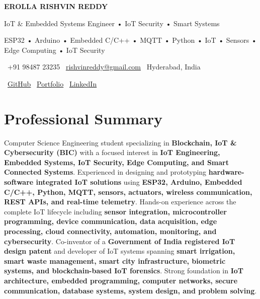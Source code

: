 \documentclass[a4paper,11pt]{article}
\begin{document}

\begin{center}

{\Huge \textbf{EROLLA RISHVIN REDDY}}

\vspace{4pt}

{\large IoT \& Embedded Systems Engineer • IoT Security • Smart Systems}

\vspace{5pt}

{\small
ESP32 • Arduino • Embedded C/C++ • MQTT • Python • IoT • Sensors • Edge Computing • IoT Security
}

\vspace{8pt}

\small
\faPhone\ +91 98487 23235
\hspace{12pt}
\faEnvelope\ \href{mailto:rishvinreddy@gmail.com}{rishvinreddy@gmail.com}
\hspace{12pt}
\faMapMarker*\ Hyderabad, India

\vspace{6pt}

\faGithub\
\href{https://github.com/RishvinReddy}{GitHub}
\hspace{14pt}
\faGlobe\
\href{https://rishvinreddy.vercel.app}{Portfolio}
\hspace{14pt}
\faLinkedin\
\href{https://www.linkedin.com/in/rishvinreddy/}{LinkedIn}

\end{center}

\vspace{-8pt}

\section{Professional Summary}

Computer Science Engineering student specializing in \textbf{Blockchain, IoT \& Cybersecurity (BIC)} with a focused interest in \textbf{IoT Engineering, Embedded Systems, IoT Security, Edge Computing, and Smart Connected Systems}. Experienced in designing and prototyping \textbf{hardware-software integrated IoT solutions} using \textbf{ESP32, Arduino, Embedded C/C++, Python, MQTT, sensors, actuators, wireless communication, REST APIs, and real-time telemetry}. Hands-on experience across the complete IoT lifecycle including \textbf{sensor integration, microcontroller programming, device communication, data acquisition, edge processing, cloud connectivity, automation, monitoring, and cybersecurity}. Co-inventor of a \textbf{Government of India registered IoT design patent} and developer of IoT systems spanning \textbf{smart irrigation, smart waste management, smart city infrastructure, biometric systems, and blockchain-based IoT forensics}. Strong foundation in \textbf{IoT architecture, embedded programming, computer networks, secure communication, database systems, system design, and problem solving}.
\end{document}
